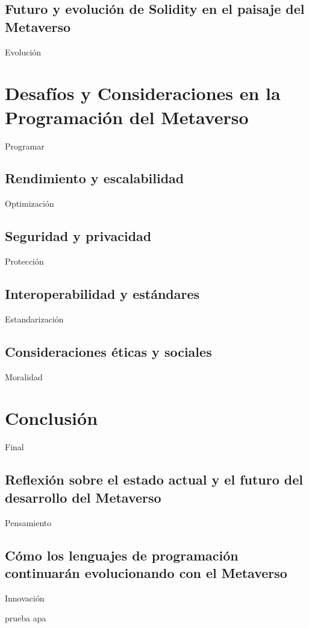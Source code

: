 \documentclass[a4paper,10pt]{article}
\begin{document}
	\subsection{Futuro y evolución de Solidity en el paisaje del Metaverso}
	Evolución
	
	\section{Desafíos y Consideraciones en la Programación del Metaverso}
	Programar
	\subsection{Rendimiento y escalabilidad}
	Optimización
	\subsection{Seguridad y privacidad}
	Protección
	\subsection{Interoperabilidad y estándares}
	Estandarización
	\subsection{Consideraciones éticas y sociales}
	Moralidad
	
	\section{Conclusión}
	Final
	\subsection{Reflexión sobre el estado actual y el futuro del desarrollo del Metaverso}
	Pensamiento
	\subsection{Cómo los lenguajes de programación continuarán evolucionando con el Metaverso}
	Innovación

	prueba apa \cite{cheng2023metaverse}
	\printbibliography[heading=bibintoc]
\end{document}
